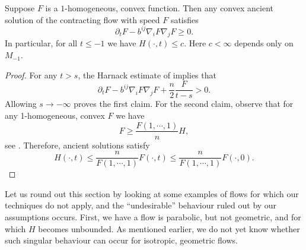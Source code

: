 \documentclass{amsart}
\begin{document}
\begin{prop}
\label{cor:boundedH}

Suppose $F$ is a \(1\)-homogeneous, convex function. Then any convex ancient solution of the contracting flow with speed $F$ satisfies
\[\partial_t F-b^{ij}\nabla_i F \nabla_j F \geq 0.\]
In particular, for all $t\le -1$ we have
$H(\cdot,t)\leq c.$
Here $c<\infty$ depends only on $M_{-1}.$
\end{prop}

\begin{proof}
For any $t>s$, the  Harnack estimate of \cite[Theorem 1]{bryan2015harnack} implies that
$$\partial_t F-b^{ij}\nabla_i F\nabla_j F+\frac{n}{2}\frac{F}{t-s}>0.$$
Allowing $s\to-\infty$ proves the first claim. For the second claim, observe that for any 1-homogeneous, convex $F$ we have \[F\ge \frac{F(1,\cdots,1)}{n}H,\]
see \cite[Chapter 2]{Gerhardt:/2006}. Therefore, ancient solutions satisfy
\[H(\cdot,t)\leq \frac{n}{F(1,\cdots,1)}F(\cdot,t)\leq \frac{n}{F(1,\cdots,1)}F(\cdot,0). \]
\end{proof}

Let us round out this section by looking at some examples of flows for which our techniques do not apply, and the ``undesirable'' behaviour ruled out by our assumptions occurs. First, we have a flow is parabolic, but not geometric, and for which \(H\) becomes unbounded. As mentioned earlier, we do not yet know whether such singular behaviour can occur for isotropic, geometric flows.
\end{document}
